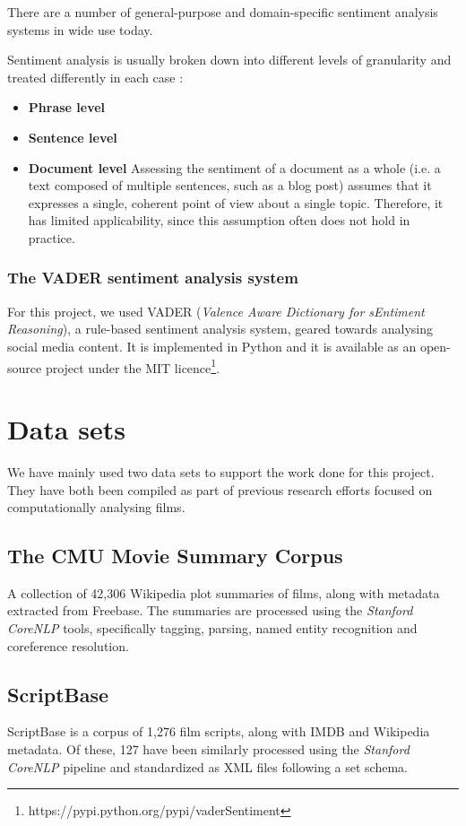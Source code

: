 \documentclass[bsc,frontabs,singlespacing,parskip, twoside]{infthesis}
\begin{document}
There are a number of general-purpose and domain-specific sentiment analysis systems in wide use today.

Sentiment analysis is usually broken down into different levels of granularity and treated differently in each case \cite{liu2012sentiment}:
\begin{itemize}
	\item \textbf{Phrase level}
	\item \textbf{Sentence level} 
	\item \textbf{Document level} Assessing the sentiment of a document as a whole (i.e. a text composed of multiple sentences, such as a blog post) assumes that it expresses a single, coherent point of view about a single topic. Therefore, it has limited applicability, since this assumption often does not hold in practice.
\end{itemize}

\subsubsection{The VADER sentiment analysis system}

For this project, we used VADER (\textit{Valence Aware Dictionary for sEntiment Reasoning})\cite{hutto2014vader}, a rule-based sentiment analysis system, geared towards analysing social media content. It is implemented in Python and it is available as an open-source project under the MIT licence\footnote{https://pypi.python.org/pypi/vaderSentiment}.

\section{Data sets} \label{sec:data sets}
We have mainly used two data sets to support the work done for this project. They have both been compiled as part of previous research efforts focused on computationally analysing films.

\subsection{The CMU Movie Summary Corpus}
A collection of 42,306 Wikipedia plot summaries of films, along with metadata extracted from Freebase. The summaries are processed using the \textit{Stanford CoreNLP} tools, specifically tagging, parsing, named entity recognition and coreference resolution.

\subsection{ScriptBase}
ScriptBase \cite{Gorinski2015} is a corpus of 1,276 film scripts, along with IMDB and Wikipedia metadata. Of these, 127 have been similarly processed using the \textit{Stanford CoreNLP} pipeline and standardized as XML files following a set schema.
\end{document}
